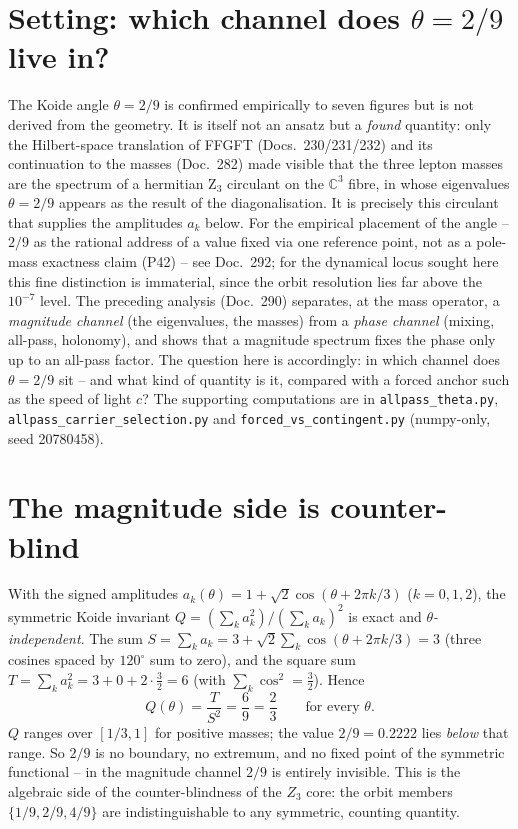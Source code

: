 \section{Setting: which channel does $\theta=2/9$ live in?}
The Koide angle $\theta=2/9$ is confirmed empirically to seven figures but is not derived from
the geometry. It is itself not an ansatz but a \emph{found} quantity: only the Hilbert-space
translation of FFGFT (Docs.~230/231/232) and its continuation to the masses (Doc.~282) made
visible that the three lepton masses are the spectrum of a hermitian Z$_3$ circulant on the
$\mathbb{C}^3$ fibre, in whose eigenvalues $\theta=2/9$ appears as the result of the
diagonalisation. It is precisely this circulant that supplies the amplitudes $a_k$ below. For the
empirical placement of the angle -- $2/9$ as the rational address of a value fixed via one
reference point, not as a pole-mass exactness claim (P42) -- see Doc.~292; for the dynamical
locus sought here this fine distinction is immaterial, since the orbit resolution lies far above
the $10^{-7}$ level. The preceding analysis (Doc.~290) separates, at the mass operator, a
\emph{magnitude channel} (the eigenvalues, the masses) from a \emph{phase channel} (mixing,
all-pass, holonomy), and shows that a magnitude spectrum fixes the phase only up to an all-pass
factor. The question here is accordingly: in which channel does $\theta=2/9$ sit -- and what
kind of quantity is it, compared with a forced anchor such as the speed of light $c$? The
supporting computations are in \texttt{allpass\_theta.py}, \texttt{allpass\_carrier\_selection.py}
and \texttt{forced\_vs\_contingent.py} (numpy-only, seed 20780458).

\section{The magnitude side is counter-blind}
With the signed amplitudes $a_k(\theta)=1+\sqrt2\cos(\theta+2\pi k/3)$ ($k=0,1,2$), the
symmetric Koide invariant $Q=(\sum_k a_k^2)/(\sum_k a_k)^2$ is exact and
\emph{$\theta$-independent}. The sum $S=\sum_k a_k=3+\sqrt2\sum_k\cos(\theta+2\pi k/3)=3$ (three
cosines spaced by $120^\circ$ sum to zero), and the square sum
$T=\sum_k a_k^2=3+0+2\cdot\tfrac32=6$ (with $\sum_k\cos^2=\tfrac32$). Hence
\[
Q(\theta)=\frac{T}{S^2}=\frac{6}{9}=\frac{2}{3}\qquad\text{for every }\theta.
\]
$Q$ ranges over $[1/3,1]$ for positive masses; the value $2/9=0.2222$ lies \emph{below} that
range. So $2/9$ is no boundary, no extremum, and no fixed point of the symmetric functional --
in the magnitude channel $2/9$ is entirely invisible. This is the algebraic side of the
counter-blindness of the $Z_3$ core: the orbit members $\{1/9,2/9,4/9\}$ are indistinguishable
to any symmetric, counting quantity.

